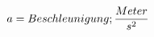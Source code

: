 \documentclass[preview]{standalone}
\begin{document}
\begin{align*}
\special{dvisvgm:raw <g id='unique000'>}a = Beschleunigung ; \frac{Meter}{s^{2}}\special{dvisvgm:raw </g>}
\end{align*}
\end{document}
